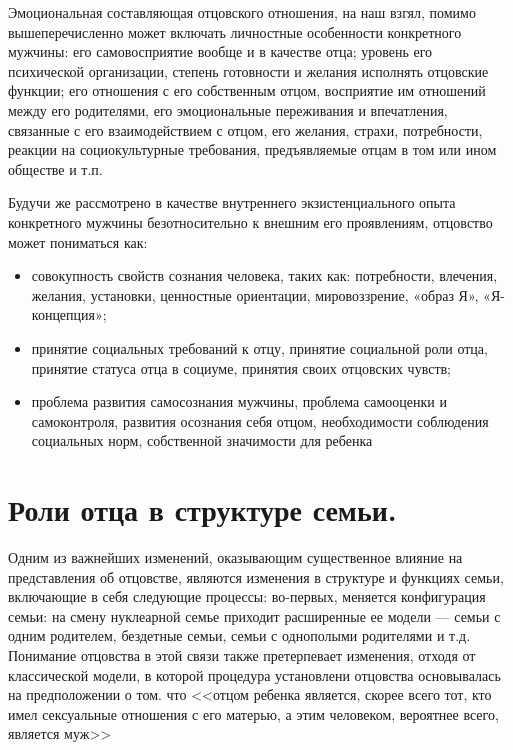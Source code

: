 \documentclass{../../common/thesisbyxetex}
\begin{document}
Эмоциональная составляющая отцовского отношения, на наш взгял, помимо вышеперечисленно может
включать личностные особенности конкретного мужчины: его самовосприятие вообще и в качестве отца;
уровень его психической организации, степень готовности и желания исполнять отцовские функции;
его отношения с его собственным отцом, восприятие им отношений между его родителями, его
эмоциональные переживания и впечатления, связанные с его взаимодействием с отцом, его желания,
страхи, потребности, реакции на социокультурные требования, предъявляемые отцам в том или ином
обществе и т.п.

Будучи же рассмотрено в качестве внутреннего экзистенциального опыта
конкретного мужчины безотносительно к внешним его проявлениям, отцовство может пониматься как:

\begin{itemize}
	\item  совокупность свойств сознания человека, таких
как: потребности, влечения, желания, установки, ценностные ориентации,
мировоззрение, «образ Я», «Я-концепция»;

\item принятие социальных требований к отцу, принятие социальной роли отца, принятие статуса отца в
социуме, принятия своих отцовских чувств;

\item проблема развития самосознания мужчины, проблема самооценки и самоконтроля, развития осознания
себя отцом, необходимости соблюдения социальных норм, собственной значимости для ребенка
\cite{psyot}
\end{itemize}



\section{Роли отца в структуре семьи.}




Одним из важнейших изменений, оказывающим существенное влияние на представления об отцовстве,
являются
изменения в структуре и функциях семьи,  включающие в себя следующие процессы:
во-первых, меняется конфигурация семьи: на смену нуклеарной семье приходит расширенные
ее модели --- семьи с одним родителем, бездетные семьи, семьи с однополыми родителями и т.д.
Понимание отцовства
в этой связи также претерпевает изменения, отходя от классической модели, в которой процедура
установлени отцовства основывалась на предположении о том. что <<отцом ребенка является, скорее
всего
 тот, кто имел сексуальные отношения с его матерью, а этим человеком, вероятнее всего,
является муж>> \cite[318]{legfat}
\end{document}
